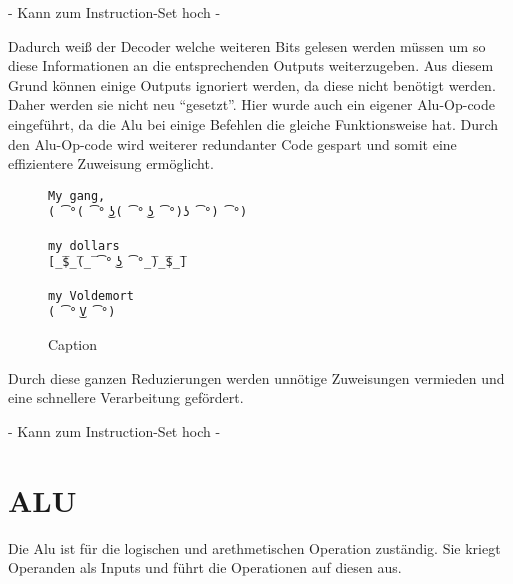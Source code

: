 \documentclass[paper=a4,fontsize=12pt,twocolumn]{scrreprt}
\begin{document}
{\color{green}- Kann zum Instruction-Set hoch - }


Dadurch weiß der Decoder welche weiteren Bits gelesen werden müssen um so diese Informationen an die entsprechenden Outputs weiterzugeben.
Aus diesem Grund können einige Outputs ignoriert werden, da diese nicht benötigt werden.
Daher werden sie nicht neu \enquote{gesetzt}.
Hier wurde auch ein eigener Alu-Op-code eingeführt, da die Alu bei einige Befehlen die gleiche Funktionsweise hat.
Durch den Alu-Op-code wird weiterer redundanter Code gespart und somit eine effizientere Zuweisung ermöglicht.


\begin{figure}
    \centering
    \begin{lstlisting}
My gang,
( ͡°( ͡° ͜ʖ( ͡° ͜ʖ ͡°)ʖ ͡°) ͡°)

my dollars
[̲̅$̲̅(̲̅ ͡° ͜ʖ ͡°̲̅)̲̅$̲̅]

my Voldemort
( ͡° ͜V ͡°)
    \end{lstlisting}
    \caption{Caption}
    \label{fig:my_label}
\end{figure}

Durch diese ganzen Reduzierungen werden unnötige Zuweisungen vermieden und eine schnellere Verarbeitung gefördert.

{\color{green}- Kann zum Instruction-Set hoch - }


\section{ALU}


Die Alu ist für die logischen und arethmetischen Operation zuständig. Sie kriegt Operanden als Inputs und führt die Operationen auf diesen aus. 
\end{document}
